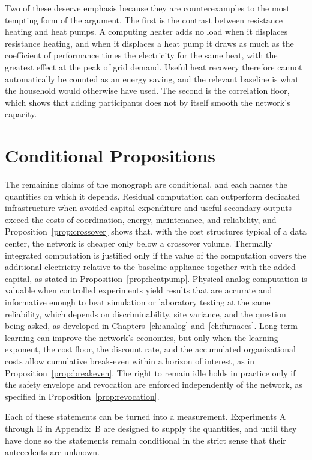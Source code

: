 Two of these deserve emphasis because they are counterexamples to the most tempting form of the argument. The first is the contrast between resistance heating and heat pumps. A computing heater adds no load when it displaces resistance heating, and when it displaces a heat pump it draws as much as the coefficient of performance times the electricity for the same heat, with the greatest effect at the peak of grid demand. Useful heat recovery therefore cannot automatically be counted as an energy saving, and the relevant baseline is what the household would otherwise have used. The second is the correlation floor, which shows that adding participants does not by itself smooth the network's capacity.

\section{Conditional Propositions}

The remaining claims of the monograph are conditional, and each names the quantities on which it depends. Residual computation can outperform dedicated infrastructure when avoided capital expenditure and useful secondary outputs exceed the costs of coordination, energy, maintenance, and reliability, and Proposition~\ref{prop:crossover} shows that, with the cost structures typical of a data center, the network is cheaper only below a crossover volume. Thermally integrated computation is justified only if the value of the computation covers the additional electricity relative to the baseline appliance together with the added capital, as stated in Proposition~\ref{prop:heatpump}. Physical analog computation is valuable when controlled experiments yield results that are accurate and informative enough to beat simulation or laboratory testing at the same reliability, which depends on discriminability, site variance, and the question being asked, as developed in Chapters~\ref{ch:analog} and~\ref{ch:furnaces}. Long-term learning can improve the network's economics, but only when the learning exponent, the cost floor, the discount rate, and the accumulated organizational costs allow cumulative break-even within a horizon of interest, as in Proposition~\ref{prop:breakeven}. The right to remain idle holds in practice only if the safety envelope and revocation are enforced independently of the network, as specified in Proposition~\ref{prop:revocation}.

Each of these statements can be turned into a measurement. Experiments A through E in Appendix~B are designed to supply the quantities, and until they have done so the statements remain conditional in the strict sense that their antecedents are unknown.

